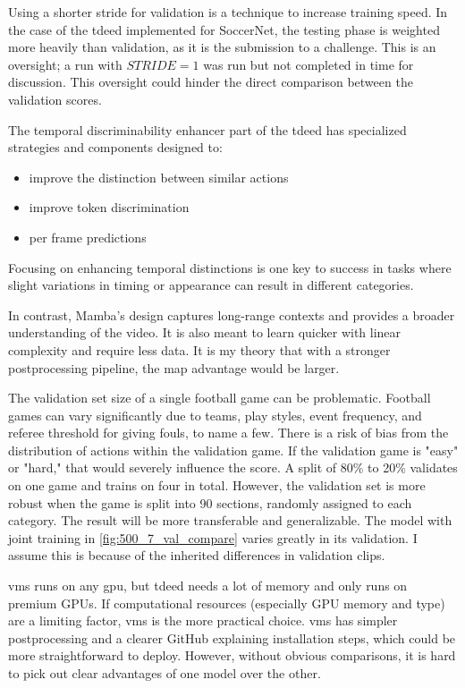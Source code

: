 Using a shorter stride for validation is a technique to increase training speed. In the case of the \acrshort{tdeed} implemented for SoccerNet, the testing phase is weighted more heavily than validation, as it is the submission to a challenge. This is an oversight; a run with \(STRIDE=1\) was run but not completed in time for discussion. This oversight could hinder the direct comparison between the validation scores. 


The temporal discriminability enhancer part of the \acrfull{tdeed} has specialized strategies and components designed to: 
\begin{itemize}
    \item improve the distinction between similar actions
    \item improve token discrimination
    \item per frame predictions
\end{itemize}

Focusing on enhancing temporal distinctions is one key to success in tasks where slight variations in timing or appearance can result in different categories. 

In contrast, Mamba's design captures long-range contexts and provides a broader understanding of the video. It is also meant to learn quicker with linear complexity and require less data. It is my theory that with a stronger postprocessing pipeline, the \acrshort{map} advantage would be larger. 

The validation set size of a single football game can be problematic. Football games can vary significantly due to teams, play styles, event frequency, and referee threshold for giving fouls, to name a few. There is a risk of bias from the distribution of actions within the validation game. If the validation game is "easy" or "hard," that would severely influence the score. A split of 80\% to 20\% validates on one game and trains on four in total. However, the validation set is more robust when the game is split into 90 sections, randomly assigned to each category. The result will be more transferable and generalizable. The model with joint training in \cref{fig:500_7_val_compare} varies greatly in its validation. I assume this is because of the inherited differences in validation clips. 

\acrshort{vms} runs on any \acrshort{gpu}, but \acrshort{tdeed} needs a lot of memory and only runs on premium GPUs. If computational resources (especially GPU memory and type) are a limiting factor, \acrshort{vms} is the more practical choice. \acrshort{vms} has simpler postprocessing and a clearer GitHub explaining installation steps, which could be more straightforward to deploy. However, without obvious comparisons, it is hard to pick out clear advantages of one model over the other. 

